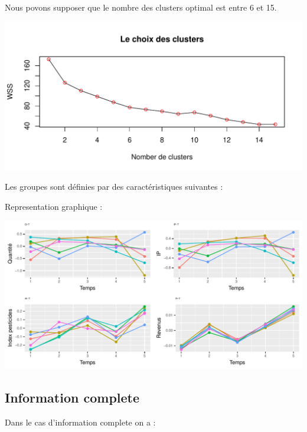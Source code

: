 \documentclass[11pt,]{article}
\begin{document}
Nous povons supposer que le nombre des clusters optimal est entre 6 et
15.

\FloatBarrier

\begin{center}\includegraphics{note2pres_files/figure-latex/unnamed-chunk-87-1} \end{center}

\FloatBarrier

Les groupes sont définies par des caractéristiques suivantes :

\FloatBarrier

Representation graphique :

\begin{center}\includegraphics{note2pres_files/figure-latex/unnamed-chunk-90-1} \end{center}

\hypertarget{information-complete}{%
\subsection{Information complete}\label{information-complete}}

Dans le cas d'information complete on a :

\par
\end{document}
